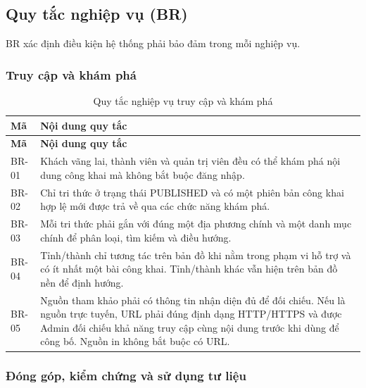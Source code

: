 \subsection{Quy tắc nghiệp vụ (BR)}
BR xác định điều kiện hệ thống phải bảo đảm trong mỗi nghiệp vụ.


\ReportNeedSpace{48mm}
\subsubsection{Truy cập và khám phá}

\begin{longtable}{|L{20mm}|L{124mm}|}
\caption{Quy tắc nghiệp vụ truy cập và khám phá}\label{tab:chapter3-br-1}\\\hline
{}\textbf{Mã} & \textbf{Nội dung quy tắc}\\\hline
\endfirsthead
\hline
{}\textbf{Mã} & \textbf{Nội dung quy tắc}\\\hline
\endhead
\endfoot
BR-01 & Khách vãng lai, thành viên và quản trị viên đều có thể khám phá nội dung công khai mà không bắt buộc đăng nhập.\\\hline
BR-02 & Chỉ tri thức ở trạng thái PUBLISHED và có một phiên bản công khai hợp lệ mới được trả về qua các chức năng khám phá.\\\hline
BR-03 & Mỗi tri thức phải gắn với đúng một địa phương chính và một danh mục chính để phân loại, tìm kiếm và điều hướng.\\\hline
BR-04 & Tỉnh/thành chỉ tương tác trên bản đồ khi nằm trong phạm vi hỗ trợ và có ít nhất một bài công khai. Tỉnh/thành khác vẫn hiện trên bản đồ nền để định hướng.\\\hline
BR-05 & Nguồn tham khảo phải có thông tin nhận diện đủ để đối chiếu. Nếu là nguồn trực tuyến, URL phải đúng định dạng HTTP/HTTPS và được Admin đối chiếu khả năng truy cập cùng nội dung trước khi dùng để công bố. Nguồn in không bắt buộc có URL.\\\hline
\end{longtable}

\ReportNeedSpace{48mm}
\subsubsection{Đóng góp, kiểm chứng và sử dụng tư liệu}

